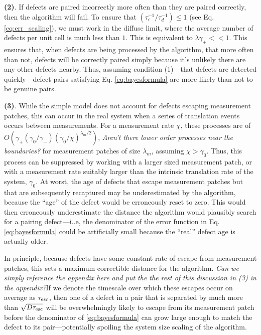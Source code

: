 \documentclass[twocolumn,superscriptaddress,aps,prb,floatfix]{revtex4-1}
\newcommand{\te}{\tau_{\rm{esc}}}
\newcommand{\CMH}[1]{{\color{green} { #1}}}
\begin{document}
 \textbf{(2)}. If defects are paired incorrectly more often than they are paired correctly, then the algorithm will fail.  To ensure that $(\tau_{\epsilon}^{-1} / \tau_d^{-1})\leq1$ (see Eq. \ref{eq:err_scaling}), we must work in the diffuse limit, where the average number of defects per unit cell is much less than $1$.  This is equivalent to $\lambda \gamma_+<<1$.  This ensures that, when defects are being processed by the algorithm, that more often than not, defects will be correctly paired simply because it's unlikely there are any other defects nearby.  Thus, assuming condition (1)---that defects are detected quickly---defect pairs satisfying Eq. \ref{eq:bayesformula} are more likely than not to be genuine pairs. 
 
 \textbf{(3)}. While the simple model does not account for defects escaping measurement patches, this can occur in the real system when a series of translation events occurs between measurements.  For a measurement rate $\chi$, these processes are of $O(\gamma_+ (\gamma_0/\gamma_-) (\gamma_0/\chi)^{\lambda_m/2})$, \CMH{\it{Aren't there lower order processes near the boundaries?}} for measurement patches of size $\lambda_m$, assuming $\chi > \gamma_0$.  Thus, this process can be suppressed by working with a larger sized measurement patch, or with a measurement rate suitably larger than the intrinsic translation rate of the system, $\gamma_0$.  At worst, the age of defects that escape measurement patches but that are subsequently recaptured may be underestimated by the algorithm, because the ``age'' of the defect would be erroneously reset to zero.  This would then erroneously underestimate the distance the algorithm would plausibly search for a pairing defect---i..e, the denominator of the error function in Eq. \ref{eq:bayesformula} could be artificially small because the ``real'' defect age is actually older.

 In principle, because defects have some constant rate of escape from measurement patches, this sets a maximum correctible distance for the algorithm.  \CMH{\it{Can we simply reference the appendix here and put the the rest of this discussion in (3) in the appendix?}}If we denote the timescale over which these escapes occur on average as $\te$, then one of a defect in a pair that is separated by much more than $\sqrt{D \te}$ will be overwhelmingly likely to escape from its measurement patch before the denominator of \eqref{eq:bayesformula} can grow large enough to match the defect to its pair---potentially spoiling the system size scaling of the algorithm.
 
\end{document}
